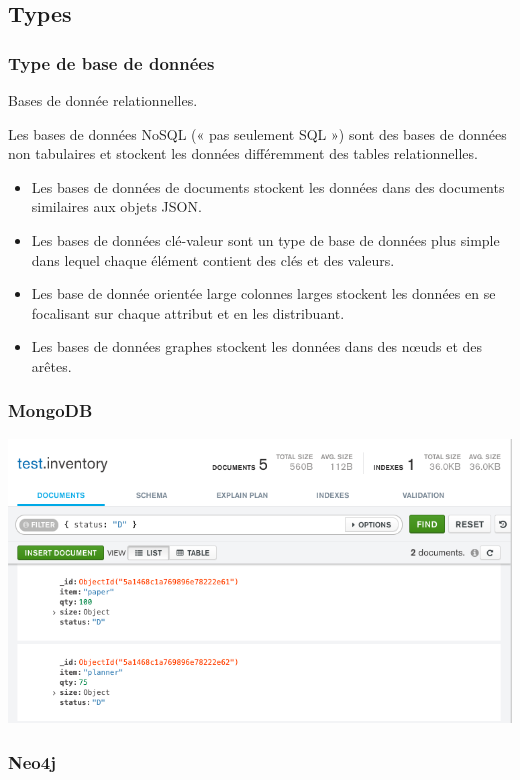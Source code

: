 \subsection{Types}

\begin{frame}
    \frametitle{Type de base de données}

    Bases de donnée relationnelles.

    \bigskip
    Les bases de données NoSQL (« pas seulement SQL ») sont des bases de données non tabulaires
    et stockent les données différemment des tables relationnelles.
    \begin{itemize}
        \item Les bases de données de documents stockent les données dans des documents similaires
        aux objets JSON.
        \item Les bases de données clé-valeur sont un type de base de données
        plus simple dans lequel chaque élément contient des clés et des valeurs.
        \item Les base de donnée orientée large colonnes larges stockent les données
        en se focalisant sur chaque attribut et en les distribuant.
        \item Les bases de données graphes stockent les données dans des nœuds et des arêtes.
    \end{itemize}

\end{frame}

\begin{frame}
    \frametitle{MongoDB}
    \centering
    \includegraphics[width=0.7\linewidth]{figures/persistence/mongodb}
\end{frame}

\begin{frame}
    \frametitle{Neo4j}
    \centering
    
\end{frame}

